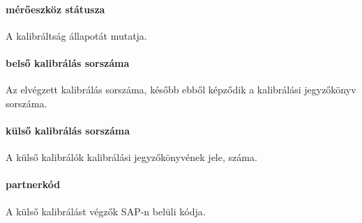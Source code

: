 \paragraph*{mérőeszköz státusza} A kalibráltság állapotát mutatja.
\paragraph*{belső kalibrálás sorszáma} Az elvégzett kalibrálás sorszáma, később ebből képződik a kalibrálási jegyzőkönyv sorszáma.
\paragraph*{külső kalibrálás sorszáma} A külső kalibrálók kalibrálási jegyzőkönyvének
jele, száma.
\paragraph*{partnerkód} A külső kalibrálást végzők SAP-n belüli kódja.

